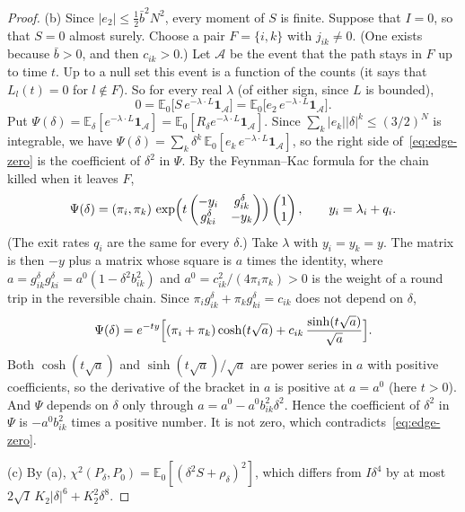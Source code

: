 \documentclass[11pt]{article}
\theoremstyle{definition}
\theoremstyle{remark}
\newcommand{\E}{\mathbb E}
\newcommand{\one}{\mathbf 1}
\begin{document}
\begin{proof}
(b) Since $\lvert e_2\rvert\le\frac12\bar b^2N^2$, every moment of $S$ is
finite. Suppose that $I=0$, so that $S=0$ almost surely. Choose a pair
$F=\{i,k\}$ with $j_{ik}\ne0$. (One exists because $\bar b>0$, and then
$c_{ik}>0$.) Let $\mathcal A$ be the event that the path stays in $F$ up to
time $t$. Up to a null set this event is a function of the counts (it says that
$L_l(t)=0$ for $l\notin F$). So for every real $\lambda$ (of either sign, since
$L$ is bounded),
\begin{equation}\label{eq:edge-zero}
 0=\E_0\bigl[S\,e^{-\lambda\cdot L}\one_{\mathcal A}\bigr]
 =\E_0\bigl[e_2\,e^{-\lambda\cdot L}\one_{\mathcal A}\bigr].
\end{equation}
Put $\Psi(\delta)=\E_\delta[e^{-\lambda\cdot L}\one_{\mathcal A}]
=\E_0[R_\delta e^{-\lambda\cdot L}\one_{\mathcal A}]$. Since
$\sum_k\lvert e_k\rvert\lvert\delta\rvert^k\le(3/2)^N$ is integrable, we have
$\Psi(\delta)=\sum_k\delta^k\,\E_0[e_k\,e^{-\lambda\cdot L}\one_{\mathcal A}]$, so
the right side of~\eqref{eq:edge-zero} is the coefficient of $\delta^2$ in
$\Psi$. By the Feynman--Kac formula for the chain killed when it leaves $F$,
\[
 \Psi(\delta)=(\pi_i,\pi_k)\,
 \exp\Bigl(t\begin{pmatrix}-y_i&g^\delta_{ik}\\ g^\delta_{ki}&-y_k\end{pmatrix}\Bigr)
 \begin{pmatrix}1\\1\end{pmatrix},\qquad y_i=\lambda_i+q_i .
\]
(The exit rates $q_i$ are the same for every $\delta$.) Take $\lambda$ with
$y_i=y_k=y$. The matrix is then $-y$ plus a matrix whose square is $a$ times
the identity, where
$a=g^\delta_{ik}g^\delta_{ki}=a^0(1-\delta^2b_{ik}^2)$ and
$a^0=c_{ik}^2/(4\pi_i\pi_k)>0$ is the weight of a round trip in the reversible
chain. Since $\pi_ig^\delta_{ik}+\pi_kg^\delta_{ki}=c_{ik}$ does not depend on
$\delta$,
\[
 \Psi(\delta)=e^{-ty}\Bigl[(\pi_i+\pi_k)\cosh(t\sqrt a)
 +c_{ik}\,\frac{\sinh(t\sqrt a)}{\sqrt a}\Bigr].
\]
Both $\cosh(t\sqrt a)$ and $\sinh(t\sqrt a)/\sqrt a$ are power series in $a$
with positive coefficients, so the derivative of the bracket in $a$ is
positive at $a=a^0$ (here $t>0$). And $\Psi$ depends on $\delta$ only through
$a=a^0-a^0b_{ik}^2\delta^2$. Hence the coefficient of $\delta^2$ in $\Psi$ is
$-a^0b_{ik}^2$ times a positive number. It is not zero, which
contradicts~\eqref{eq:edge-zero}.

(c) By (a), $\chi^2(P_\delta,P_0)=\E_0[(\delta^2S+\rho_\delta)^2]$, which
differs from $I\delta^4$ by at most
$2\sqrt I\,K_2\lvert\delta\rvert^6+K_2^2\delta^8$.
\end{proof}
\end{document}
